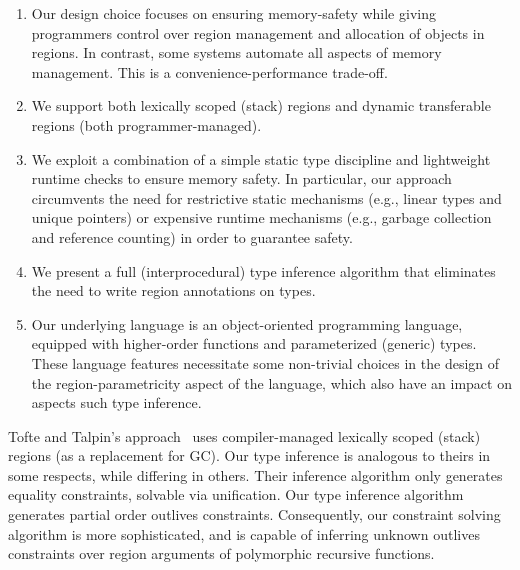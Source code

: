 \begin{enumerate}
\item 
   Our design choice focuses on ensuring memory-safety while giving programmers
   control over  region management and allocation of objects in regions.
   In contrast, some systems automate all aspects of memory management.
   This is a convenience-performance trade-off.

\item We support both lexically scoped (stack) regions and dynamic transferable
regions (both programmer-managed).

\item We exploit a combination of a simple static type discipline and lightweight
  runtime checks to ensure memory safety.
In particular, our approach circumvents the need for restrictive
static mechanisms (e.g., linear types and unique pointers) or
expensive runtime mechanisms (e.g., garbage collection and reference
counting) in order to guarantee safety.

\item We present a full (interprocedural) type inference algorithm
that eliminates the need to write region annotations on types.

\item Our underlying language is an object-oriented programming language,
equipped with higher-order functions and parameterized (generic) types.
These language features necessitate some non-trivial choices in the design
of the region-parametricity aspect of the language, which also have an
impact on aspects such type inference.

\end{enumerate}

Tofte and Talpin's approach~\cite{tofte97} uses compiler-managed lexically
scoped (stack) regions (as a replacement for GC).
Our type inference is analogous to theirs in some respects,
while differing in others.
Their inference algorithm only generates equality constraints, solvable via unification.
Our type inference algorithm generates partial order outlives constraints.
Consequently, our constraint solving algorithm is
more sophisticated, and is capable of inferring unknown outlives
constraints over region arguments of polymorphic recursive functions.

